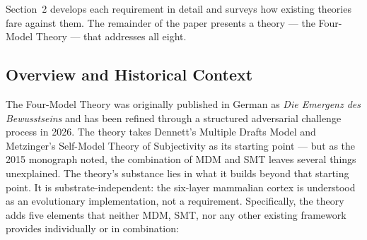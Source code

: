 \documentclass[12pt]{article}
\begin{document}
Section~2 develops each requirement in detail and surveys how existing theories fare against them. The remainder of the paper presents a theory --- the Four-Model Theory --- that addresses all eight.


\subsection{Overview and Historical Context}


The Four-Model Theory was originally published in German as \emph{Die Emergenz des Bewusstseins} \citep{Gruber2015} and has been refined through a structured adversarial challenge process in 2026. The theory takes Dennett's Multiple Drafts Model \citep{Dennett1991} and Metzinger's Self-Model Theory of Subjectivity \citep{Metzinger2003,Metzinger2009} as its starting point --- but as the 2015 monograph noted, the combination of MDM and SMT leaves several things unexplained. The theory's substance lies in what it builds beyond that starting point. It is substrate-independent: the six-layer mammalian cortex is understood as an evolutionary implementation, not a requirement. Specifically, the theory adds five elements that neither MDM, SMT, nor any other existing framework provides individually or in combination:
\end{document}
